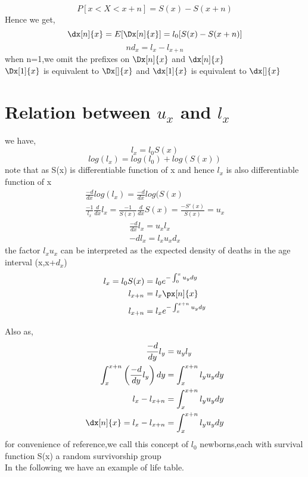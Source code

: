 

$$P[x<X<x+n]=S(x)-S(x+n)$$
Hence we get,
$$\dx[n]{x}=E[\Dx[n]{x}]=l_0[S(x)-S(x+n)]$$
$$n{d_x}=l_x-l_{x+n}$$
when n=1,we omit the prefixes on $\Dx[n]{x}$ and $\dx[n]{x}$ \\
$\Dx[1]{x}$ is equivalent to $\Dx[]{x}$  and $\dx[1]{x}$ is equivalent to $\dx[]{x}$


\section{Relation between $u_x$ and $l_x$}
we have,$$l_x=l_0S(x)$$
$$log(l_x)=log(l_0)+log(S(x))$$
note that as S(x) is differentiable function of x and hence $l_x$ is also differentiable function of x\\
\begin{align*}
\frac{-d}{dx} log(l_x)=\frac{-d}{dx} log(S(x)\\
\frac{-1}{l_x}\frac{d}{dx} l_x=\frac{-1}{S(x)}\frac{d}{dx} S(x)=\frac{-S'(x)}{S(x)}=u_x
\end{align*}
\begin{align*}
\frac{-d}{dx} l_x=u_xl_x\\
-dl_x=l_xu_xd_x
\end{align*}
the factor $l_xu_x$ can be interpreted as the expected density of deaths in the age interval (x,x+$d_x$)\\
\begin{align*}
l_x=l_0S(x)&=l_0e^{-\int_{0}^{x} u_y dy}\\
l_{x+n}&=l_x \px[n]{x}\\
l_{x+n}&=l_xe^{-\int_{x}^{x+n} u_y dy}
\end{align*}

Also as,
\begin{align*}
\frac{-d}{dy} l_y&=u_yl_y\\
\int_{x}^{x+n}\left(\frac{-d}{dy}l_y\right) dy&=\int_{x}^{x+n}l_y u_y dy\\
l_x-l_{x+n}&=\int_{x}^{x+n}l_y u_y dy\\
\dx[n]{x}=l_x-l_{x+n}&=\int_{x}^{x+n}l_y u_y dy
\end{align*}
for convenience of reference,we call this concept of $l_0$ newborns,each with survival function S(x) a random survivorship group\\
In the following we have an example of life table.


